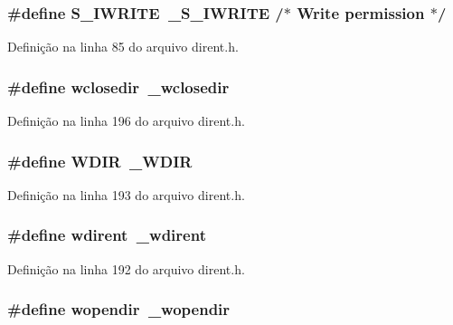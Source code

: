 \subsubsection[{S\+\_\+\+I\+W\+R\+I\+TE}]{\setlength{\rightskip}{0pt plus 5cm}\#define S\+\_\+\+I\+W\+R\+I\+TE~\+\_\+\+S\+\_\+\+I\+W\+R\+I\+TE                   /$\ast$ Write permission $\ast$/}\label{dirent_8h_a40eb4ad4bcc675d265615042657c37b7}


Definição na linha 85 do arquivo dirent.\+h.

\subsubsection[{wclosedir}]{\setlength{\rightskip}{0pt plus 5cm}\#define wclosedir~\+\_\+wclosedir}\label{dirent_8h_a783634d83dcc99d8a393b22893acfe66}


Definição na linha 196 do arquivo dirent.\+h.

\subsubsection[{W\+D\+IR}]{\setlength{\rightskip}{0pt plus 5cm}\#define W\+D\+IR~{\bf \+\_\+\+W\+D\+IR}}\label{dirent_8h_aa97efcb21eb4eb1172ca3ac581309f09}


Definição na linha 193 do arquivo dirent.\+h.

\subsubsection[{wdirent}]{\setlength{\rightskip}{0pt plus 5cm}\#define wdirent~{\bf \+\_\+wdirent}}\label{dirent_8h_acced66b96e07a03662493638658986f4}


Definição na linha 192 do arquivo dirent.\+h.

\subsubsection[{wopendir}]{\setlength{\rightskip}{0pt plus 5cm}\#define wopendir~\+\_\+wopendir}\label{dirent_8h_a728bb1173e923c1ae0801c1d91370c0e}


